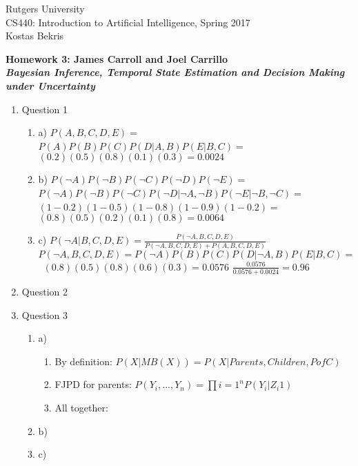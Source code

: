 \documentclass[11pt]{article}
\begin{document}
\sloppy

\noindent Rutgers University\\
CS440: Introduction to Artificial Intelligence, Spring 2017\\
Kostas Bekris\\

\begin{center}
\LARGE{\textbf{Homework 3: James Carroll and Joel Carrillo}}\\
\large{\textbf{\emph{Bayesian Inference, Temporal State Estimation and Decision Making under Uncertainty}}}
\end{center}

\vspace{.1in}

\begin{enumerate}

\item Question 1
\begin{enumerate}

\item a) $P(A, B, C, D, E) =$ \
$P(A)P(B)P(C)P(D|A,B)P(E|B,C) =$ \
$(0.2)(0.5)(0.8)(0.1)(0.3) = 0.0024$

\item b) $P(\neg A)P(\neg B)P(\neg C)P(\neg D)P(\neg E) =$ \
 $P(\neg A)P(\neg B)P(\neg C)P(\neg D|\neg A, \neg B)P(\neg E|\neg B, \neg C) =$ \
$(1 - 0.2)(1 - 0.5)(1 - 0.8)(1 - 0.9)(1 - 0.2) =$ \
$(0.8)(0.5)(0.2)(0.1)(0.8) = 0.0064$

\item c) $P(\neg A | B, C, D, E) =\frac{P(\neg A, B, C, D, E)}{P(\neg A, B, C, D, E) + P(A, B, C, D, E)}$ \
$P(\neg A, B, C, D, E) = P(\neg A)P(B)P(C)P(D |\neg A, B)P(E | B, C) = $ \
$(0.8)(0.5)(0.8)(0.6)(0.3) = 0.0576$ 
$\frac{0.0576}{0.0576+0.0024} = 0.96$
\end{enumerate}

\item Question 2

\item Question 3
\begin{enumerate}
\item a) 
\begin{enumerate}
\item By definition: $P(X|MB(X)) = P(X|Parents,Children,PofC) $
\item FJPD for parents: $P(Y_i, ..., Y_n) = \prod{i = 1}^{n} P(Y_i | Z_{i}1)$ 
\item All together: 
\end{enumerate}
\item b)
\item c)
\end{enumerate}


\end{enumerate}
\end{document}
